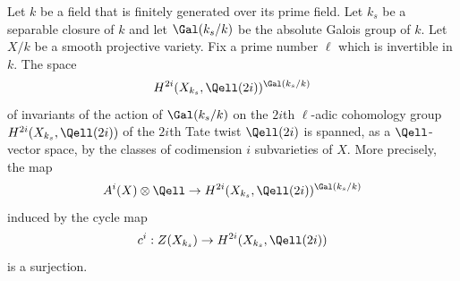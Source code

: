 \begin{conjecture} \label{conjecture:tates_conjecture}
    Let $k$ be a field that is finitely generated over its prime field. Let $k_s$ be a separable closure of $k$ and let $\Gal(k_s/k)$ be the absolute Galois group of $k$. Let $X/k$ be a smooth projective variety. Fix a prime number $\ell$ which is invertible in $k$. The space
    $$H^{2i}(X_{k_s}, \Qell(2i))^{\Gal(k_s/k)}$$
    of invariants of the action of $\Gal(k_s/k)$ on the $2i$th $\ell$-adic cohomology group $H^{2i}(X_{k_s}, \Qell(2i))$ of the $2i$th Tate twist $\Qell(2i)$ is spanned, as a $\Qell$-vector space, by the classes of codimension $i$ subvarieties of $X$. More precisely, the map 
    $$ A^i(X) \otimes \Qell \to H^{2i}(X_{k_s}, \Qell(2i))^{\Gal(k_s/k)}$$
    induced by the cycle map
    $$c^i: Z(X_{k_s}) \to H^{2i}(X_{k_s}, \Qell(2i))$$
    is a surjection.
\end{conjecture}